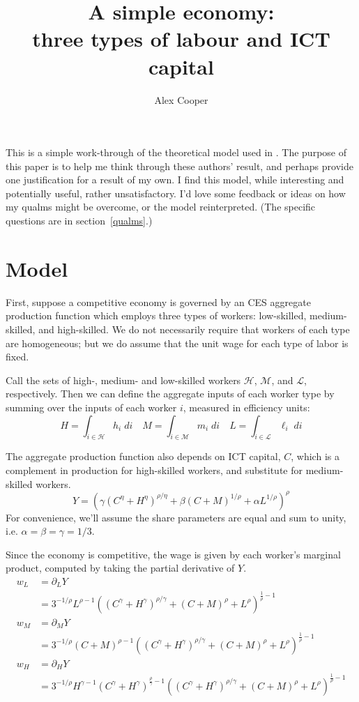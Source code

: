 \documentclass[a4paper]{article}
\title{A simple economy:\\ three types of labour and ICT capital}
\author{Alex Cooper}
\newcommand{\ELL}{\mathcal{L}}
\newcommand{\EH}{\mathcal{H}}
\newcommand{\M}{\mathcal{M}}
\begin{document}
\maketitle

This is a simple work-through of the theoretical model used in \citet{Michaels2010}. The purpose of this paper is to help me think through these authors' result, and perhaps provide one justification for a result of my own. I find this model, while interesting and potentially useful, rather unsatisfactory. I'd love some feedback or ideas on how my qualms might be overcome, or the model reinterpreted. (The specific questions are in section~\ref{qualms}.)

\section{Model}

First, suppose a competitive economy is governed by an CES aggregate production function which employs three types of workers: low-skilled, medium-skilled, and high-skilled. We do not necessarily require that workers of each type are homogeneous; but we do assume that the unit wage for each type of labor is fixed. 

Call the sets of high-, medium- and low-skilled workers $\EH$, $\M$, and $\ELL$, respectively. Then we can define the aggregate inputs of each worker type by summing over the inputs of each worker $i$, measured in efficiency units:
$$ H = \int_{i\in\EH}h_i\;di\quad 
     M = \int_{i\in\M}m_i\;di\quad
     L = \int_{i\in\ELL}\ell_i\;di $$

The aggregate production function also depends on ICT capital, $C$, which is a complement in production for high-skilled workers, and substitute for medium-skilled workers.
\begin{equation}\label{eq:prod}
  Y=\left(\gamma \left(C^{\eta }+H^{\eta }\right)^{\rho /\eta }+\beta  (C+M)^{1/\rho }+\alpha  L^{1/\rho }\right)^{\rho }
\end{equation}
For convenience, we'll assume the share parameters are equal and sum to unity, i.e. $\alpha=\beta=\gamma=1/3$.

Since the economy is competitive, the wage is given by each worker's marginal product, computed by taking the partial derivative of $Y$.
\begin{align*}
w_L &= \partial_LY \\
    &= 3^{-1/\rho } L^{\rho -1} \left(\left(C^{\gamma }+H^{\gamma }\right)^{\rho /\gamma }+(C+M)^{\rho }+L^{\rho }\right)^{\frac{1}{\rho }-1} \\
w_M &= \partial_MY \\
    &= 3^{-1/\rho } (C+M)^{\rho -1} \left(\left(C^{\gamma }+H^{\gamma }\right)^{\rho /\gamma }+(C+M)^{\rho }+L^{\rho }\right)^{\frac{1}{\rho }-1} \\
w_H &= \partial_HY \\
    &= 3^{-1/\rho } H^{\gamma -1} \left(C^{\gamma }+H^{\gamma }\right)^{\frac{\rho }{\gamma }-1} \left(\left(C^{\gamma }+H^{\gamma }\right)^{\rho /\gamma }+(C+M)^{\rho }+L^{\rho }\right)^{\frac{1}{\rho }-1}
\end{align*}
\end{document}

